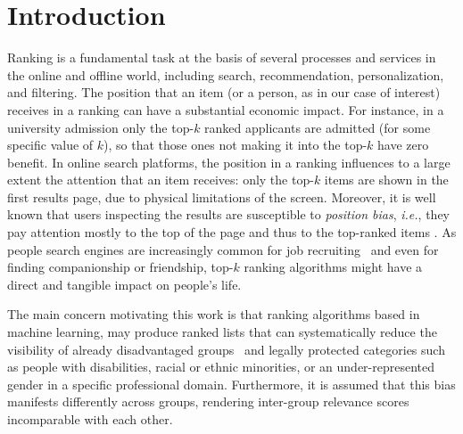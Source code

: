 \section{Introduction}\label{sec:introduction}
Ranking is a fundamental task at the basis of several processes and services in the online and offline world, including search, recommendation, personalization, and filtering.
%
The position that an item (or a person, as in our case of interest) receives in a ranking can have a substantial economic impact.
%
For instance, in a university admission only the top-$k$ ranked applicants are admitted (for some specific value of $k$), so that those ones not making it into the top-$k$ have zero benefit.
%
In online search platforms, the position in a ranking influences to a large extent the attention that an item receives: only the top-$k$ items are shown in the first results page, due to physical limitations of the screen.
%
Moreover, it is well known that users inspecting the results are susceptible to \emph{position bias}, {\em i.e.}, they pay attention mostly to the top of the page and thus to the top-ranked items \cite{CraswellZTR08}.
%
As people search engines are increasingly common for job recruiting~\cite{raghavan2020mitigating} and even for finding companionship or friendship, top-$k$ ranking algorithms might have a direct and tangible impact on people's life.


The main concern motivating this work is that ranking algorithms based in machine learning, may produce ranked lists that can systematically reduce the visibility of already disadvantaged groups~\cite{peder2008,Dwork2012} and legally protected categories such as people with disabilities, racial or ethnic minorities, or an under-represented gender in a specific professional domain.
%
%
Furthermore, it is assumed that this bias manifests differently across groups, rendering inter-group relevance scores incomparable with each other.

